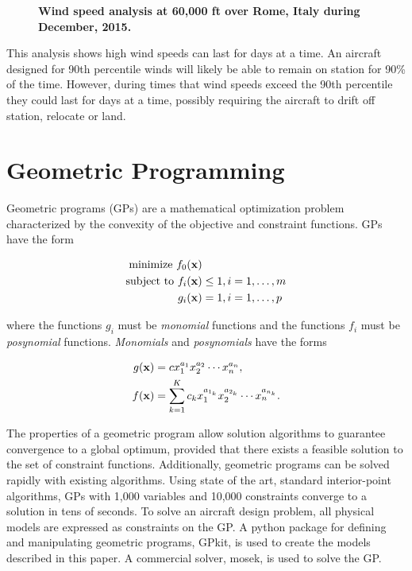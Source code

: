 \documentclass[]{aiaa-tc}%
\begin{document}
\begin{figure}[H]
 \begin{subfigmatrix}{2}%
 \end{subfigmatrix}
 \caption{\textbf{Wind speed analysis at 60,000 ft over Rome, Italy during December, 2015.}}
 \label{f:romewinds}
\end{figure}

This analysis shows high wind speeds can last for days at a time.  
An aircraft designed for 90th percentile winds will likely be able to remain on station for 90\% of the time.  
However, during times that wind speeds exceed the 90th percentile they could last for days at a time, possibly requiring the aircraft to drift off station, relocate or land. 

\section{Geometric Programming\cite{gp}}

Geometric programs (GPs) are a mathematical optimization problem characterized by the convexity of the objective and constraint functions. GPs have the form

\begin{align} 
\label{e:gpform}
\text{minimize } f_0(\bold{x}) & \nonumber \\
\text{subject to  } f_i(\bold{x}) &\leq 1, i=1,\ldots,m \\
g_i (\bold{x}) &= 1, i = 1,\ldots,p \nonumber 
\end{align}

where the functions $g_i$ must be \emph{monomial} functions and the functions $f_i$ must be \emph{posynomial} functions. \emph{Monomials} and \emph{posynomials} have the forms

\begin{align}
 \label{e:mon}
g(\bold{x}) &= c x_1^{a_1} x_2^{a_2} \dotsm x_n^{a_n} , \\
\label{e:pos}
f(\bold{x}) &= \displaystyle\sum_{k=1}^K c_k x_1^{a_{1_k}} x_2^{a_{2_k}} \dotsm x_n^{a_{n_k}}.
\end{align}

The properties of a geometric program allow solution algorithms to guarantee convergence to a global optimum, provided that there exists a feasible solution to the set of constraint functions.  
Additionally, geometric programs can be solved rapidly with existing algorithms.  
Using state of the art, standard interior-point algorithms, GPs with 1,000 variables and 10,000 constraints converge to a solution in tens of seconds.\cite{gp}  
To solve an aircraft design problem, all physical models are expressed as constraints on the GP.\cite{hoburgthesis} 
A python package for defining and manipulating geometric programs, GPkit\cite{gpkitdocs}, is used to create the models described in this paper.  A commercial solver, mosek\cite{mosek}, is used to solve the GP. \\
\end{document}
